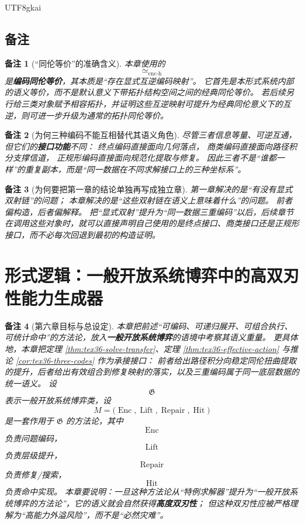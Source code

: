 \documentclass[12pt]{article}
\newtheorem{remark}{备注}[section]
\begin{document}
\begin{CJK*}{UTF8}{gkai}
\subsection{备注}
\label{subsec:tex36-ch5-remarks}

\begin{remark}[“同伦等价”的准确含义]
本章使用的
\[
  \simeq_{\mathrm{enc\text{-}h}}
\]
是\textbf{编码同伦等价}，其本质是“存在显式互逆编码映射”。
它首先是本形式系统内部的语义等价，而不是默认意义下带拓扑结构空间之间的经典同伦等价。
若后续另行给三类对象赋予相容拓扑，并证明这些互逆映射可提升为经典同伦意义下的互逆，则可进一步升级为通常的拓扑同伦等价。
\end{remark}

\begin{remark}[为何三种编码不能互相替代其语义角色]
尽管三者信息等量、可逆互通，但它们的\textbf{接口功能}不同：
终点编码直接面向几何落点，
商类编码直接面向路径积分支撑信道，
正规形编码直接面向规范化提取与修复。
因此三者不是“谁都一样”的重复副本，而是“同一数据在不同求解接口上的三种坐标系”。
\end{remark}

\begin{remark}[为何要把第一章的结论单独再写成独立章]
第一章解决的是“有没有显式双射链”的问题；
本章解决的是“这些双射链在语义上意味着什么”的问题。
前者偏构造，后者偏解释。
把“显式双射”提升为“同一数据三重编码”以后，后续章节在调用这些对象时，就可以直接声明自己使用的是终点接口、商类接口还是正规形接口，而不必每次回退到最初的构造证明。
\end{remark}

\clearpage
\section{形式逻辑：一般开放系统博弈中的高双刃性能力生成器}
\label{sec:tex36-ch6}

\begin{remark}[第六章目标与总设定]
本章把前述“可编码、可递归展开、可组合执行、可统计命中”的方法论，放入\textbf{一般开放系统博弈}的语境中考察其语义重量。
更具体地，本章把定理 \ref{thm:tex36-solve-transfer}、定理 \ref{thm:tex36-effective-action} 与推论 \ref{cor:tex36-three-codes} 作为承接接口：
  前者给出路径积分向稳定同伦扭曲提取的提升，后者给出有效组合到修复映射的落实，以及三重编码属于同一底层数据的统一语义。
设
\[
  \mathfrak G
\]
表示一般开放系统博弈类，设
\[
  M
  =
  \bigl(
    \operatorname{Enc},
    \operatorname{Lift},
    \operatorname{Repair},
    \operatorname{Hit}
  \bigr)
\]
是一套作用于 $\mathfrak G$ 的方法论，其中
\[
  \operatorname{Enc}
\]
负责问题编码，
\[
  \operatorname{Lift}
\]
负责层级提升，
\[
  \operatorname{Repair}
\]
负责修复/搜索，
\[
  \operatorname{Hit}
\]
负责命中实现。
本章要说明：一旦这种方法论从“特例求解器”提升为“一般开放系统博弈的方法论”，它的语义就会自然获得\textbf{高度双刃性}；
但这种双刃性应被严格理解为“高能力外溢风险”，而不是“必然灾难”。
\end{remark}


\end{CJK*}
\end{document}
